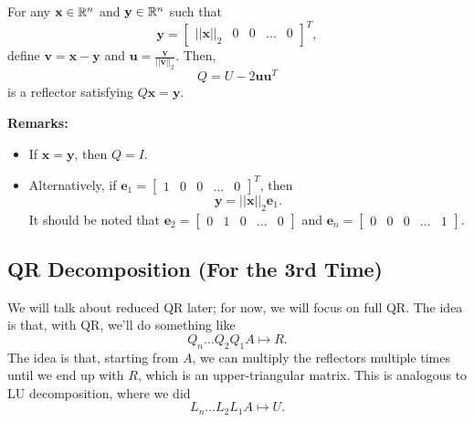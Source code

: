\documentclass[letterpaper]{article}
\newcommand{\0}{\mathbf{0}}
\newcommand{\y}{\mathbf{y}}
\newcommand{\x}{\mathbf{x}}
\newcommand{\e}{\mathbf{e}}
\newcommand{\vv}{\mathbf{v}}
\renewcommand{\u}{\mathbf{u}}
\begin{document}
\begin{lemma}{}{}
    For any $\x \in \R^n$ and $\y \in \R^n$ such that \[\y = \begin{bmatrix}
        ||\x||_2 & 0 & 0 & \hdots & 0
    \end{bmatrix}^T,\]
    define $\vv = \x - \y$ and $\u = \frac{\vv}{||\vv||_2}$. Then, 
    \[Q = U - 2\u\u^T\] is a reflector satisfying $Q\x = \y$. 
\end{lemma}
\textbf{Remarks:} 
\begin{itemize}
    \item If $\x = \y$, then $Q = I$.
    \item Alternatively, if $\e_1 = \begin{bmatrix}
        1 & 0 & 0 & \hdots & 0
    \end{bmatrix}^T$, then 
    \[\y = ||\x||_2 \e_1.\] It should be noted that $\e_2 = \begin{bmatrix}
        0 & 1 & 0 & \hdots & 0
    \end{bmatrix}$ and $\e_n = \begin{bmatrix}
        0 & 0 & 0 & \hdots & 1
    \end{bmatrix}$. 
\end{itemize} 

\subsection{QR Decomposition (For the 3rd Time)}
We will talk about reduced QR later; for now, we will focus on full QR. The idea is that, with QR, we'll do something like 
\[Q_n \hdots Q_2 Q_1 A \mapsto R.\]
The idea is that, starting from $A$, we can multiply the reflectors multiple times until we end up with $R$, which is an upper-triangular matrix. This is analogous to LU decomposition, where we did 
\[L_n \hdots L_2 L_1 A \mapsto U.\]
\end{document}
